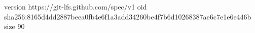 version https://git-lfs.github.com/spec/v1
oid sha256:8165d4dd2887beea0fb4e6f1a3add34260be4f7b6d10268387ae6c7e1e6e446b
size 90
